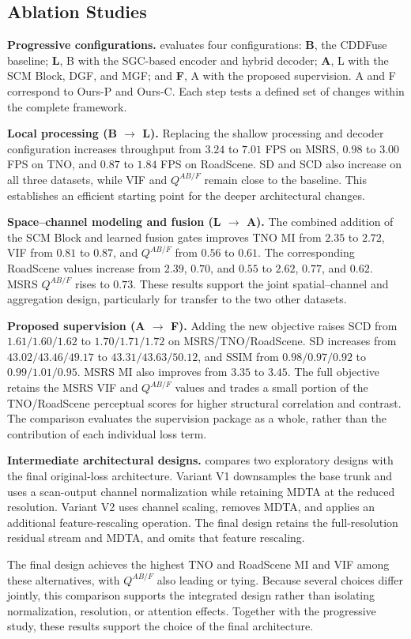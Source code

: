 \subsection{Ablation Studies}\label{subsec:ablation_study}
\textbf{Progressive configurations.}
 evaluates four configurations: \textbf{B}, the CDDFuse baseline; \textbf{L}, B with the SGC-based encoder and hybrid decoder; \textbf{A}, L with the SCM Block, DGF, and MGF; and \textbf{F}, A with the proposed supervision. A and F correspond to Ours-P and Ours-C. Each step tests a defined set of changes within the complete framework.


\textbf{Local processing (B $\to$ L).}
Replacing the shallow processing and decoder configuration increases throughput from $3.24$ to $7.01$ FPS on MSRS, $0.98$ to $3.00$ FPS on TNO, and $0.87$ to $1.84$ FPS on RoadScene. SD and SCD also increase on all three datasets, while VIF and $Q^{AB/F}$ remain close to the baseline. This establishes an efficient starting point for the deeper architectural changes.

\textbf{Space--channel modeling and fusion (L $\to$ A).}
The combined addition of the SCM Block and learned fusion gates improves TNO MI from $2.35$ to $2.72$, VIF from $0.81$ to $0.87$, and $Q^{AB/F}$ from $0.56$ to $0.61$. The corresponding RoadScene values increase from $2.39$, $0.70$, and $0.55$ to $2.62$, $0.77$, and $0.62$. MSRS $Q^{AB/F}$ rises to $0.73$. These results support the joint spatial--channel and aggregation design, particularly for transfer to the two other datasets.

\textbf{Proposed supervision (A $\to$ F).}
Adding the new objective raises SCD from $1.61/1.60/1.62$ to $1.70/1.71/1.72$ on MSRS/TNO/RoadScene. SD increases from $43.02/43.46/49.17$ to $43.31/43.63/50.12$, and SSIM from $0.98/0.97/0.92$ to $0.99/1.01/0.95$. MSRS MI also improves from $3.35$ to $3.45$. The full objective retains the MSRS VIF and $Q^{AB/F}$ values and trades a small portion of the TNO/RoadScene perceptual scores for higher structural correlation and contrast. The comparison evaluates the supervision package as a whole, rather than the contribution of each individual loss term.

\textbf{Intermediate architectural designs.}
 compares two exploratory designs with the final original-loss architecture. Variant V1 downsamples the base trunk and uses a scan-output channel normalization while retaining MDTA at the reduced resolution. Variant V2 uses channel scaling, removes MDTA, and applies an additional feature-rescaling operation. The final design retains the full-resolution residual stream and MDTA, and omits that feature rescaling.

The final design achieves the highest TNO and RoadScene MI and VIF among these alternatives, with $Q^{AB/F}$ also leading or tying. Because several choices differ jointly, this comparison supports the integrated design rather than isolating normalization, resolution, or attention effects. Together with the progressive study, these results support the choice of the final architecture.
